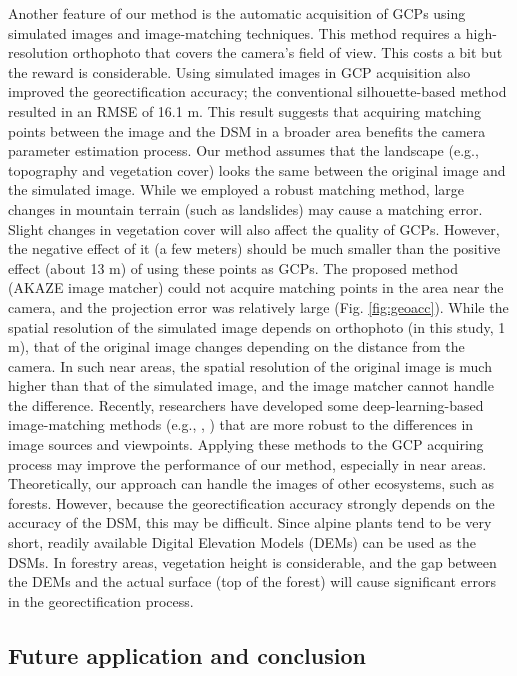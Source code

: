 \documentclass{article}
\begin{document}
Another feature of our method is the automatic acquisition of GCPs using simulated images and image-matching techniques. This method requires a high-resolution orthophoto that covers the camera's field of view. This costs a bit but the reward is considerable. Using simulated images in GCP acquisition also improved the georectification accuracy; the conventional silhouette-based method resulted in an RMSE of 16.1 m. This result suggests that acquiring matching points between the image and the DSM in a broader area benefits the camera parameter estimation process. Our method assumes that the landscape (e.g., topography and vegetation cover) looks the same between the original image and the simulated image. While we employed a robust matching method, large changes in mountain terrain (such as landslides) may cause a matching error. Slight changes in vegetation cover will also affect the quality of GCPs. However, the negative effect of it (a few meters) should be much smaller than the positive effect (about 13 m) of using these points as GCPs. The proposed method (AKAZE image matcher) could not acquire matching points in the area near the camera, and the projection error was relatively large (Fig. \ref{fig:geoacc}). While the spatial resolution of the simulated image depends on orthophoto (in this study, 1 m), that of the original image changes depending on the distance from the camera. In such near areas, the spatial resolution of the original image is much higher than that of the simulated image, and the image matcher cannot handle the difference. Recently, researchers have developed some deep-learning-based image-matching methods (e.g., \cite{Yang2018ImageMatching}, \cite{Wu2013AEImageMatching}) that are more robust to the differences in image sources and viewpoints. Applying these methods to the GCP acquiring process may improve the performance of our method, especially in near areas.
Theoretically, our approach can handle the images of other ecosystems, such as forests. However, because the georectification accuracy strongly depends on the accuracy of the DSM, this may be difficult. Since alpine plants tend to be very short, readily available Digital Elevation Models (DEMs) can be used as the DSMs. In forestry areas, vegetation height is considerable, and the gap between the DEMs and the actual surface (top of the forest) will cause significant errors in the georectification process.

\hypertarget{future-application-and-conclusion}{%
\subsection{Future application and conclusion}\label{future-application-and-conclusion}}
\end{document}
